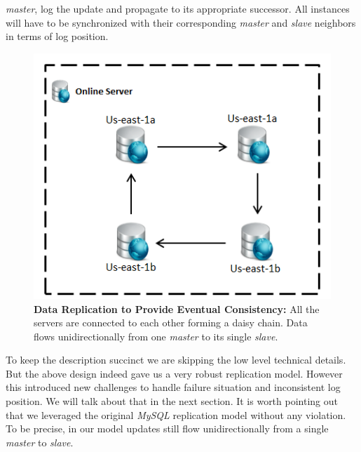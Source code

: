 \documentclass[12pt]{article}
\begin{document}
\emph{master}, log the update and propagate to its appropriate successor. All
instances will have to be synchronized with their corresponding \emph{master}
and \emph{slave} neighbors in terms of log position.  
\begin{figure}[H]
\centering 
\includegraphics[scale=0.8]{Images/figure2.PNG} 
\caption{\textbf{Data Replication to Provide Eventual Consistency: }All the servers are connected to
each other forming a daisy chain. Data flows unidirectionally from one
\emph{master} to its single \emph{slave}. } 
\label{fig:connectreplication}
\end{figure} To keep the description succinct we are skipping the low level
technical details. But the above design indeed gave us a very robust replication
model. However this introduced new challenges to handle failure situation and
inconsistent log position. We will talk about that in the next section. It is
worth pointing out that we leveraged the original \emph{MySQL} replication model
without any violation. To be precise, in our model updates still flow
unidirectionally from a single \emph{master} to \emph{slave}.
\end{document}
